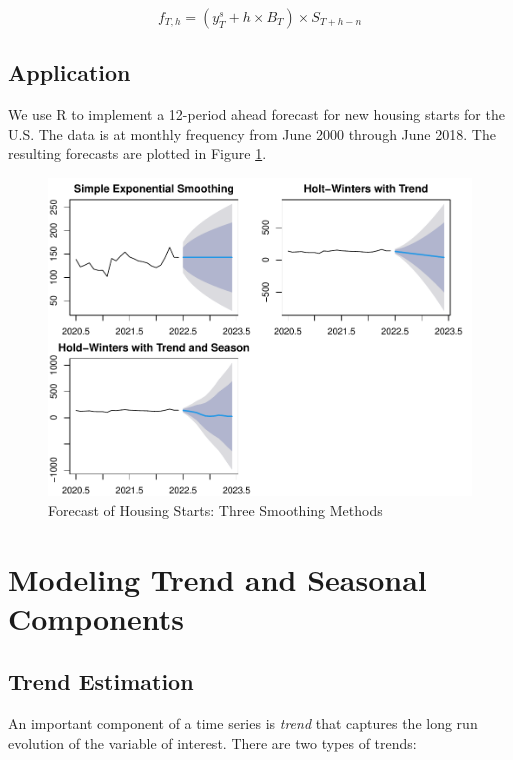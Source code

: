 \documentclass[]{book}
\theoremstyle{definition}
\theoremstyle{definition}
\theoremstyle{definition}
\theoremstyle{remark}
\begin{document}
\begin{equation}
    f_{T,h}= (y_T^s + h\times B_T) \times S_{T+h-n}
   \end{equation}

\hypertarget{application}{%
\section{Application}\label{application}}

We use R to implement a 12-period ahead forecast for new housing starts
for the U.S. The data is at monthly frequency from June 2000 through
June 2018. The resulting forecasts are plotted in Figure
\ref{fig:ch4-figure1}.

\begin{figure}

{\centering \includegraphics[width=0.8\linewidth]{bookdown-demo_files/figure-latex/ch4-figure1-1} 

}

\caption{Forecast of Housing Starts: Three Smoothing Methods}\label{fig:ch4-figure1}
\end{figure}

\hypertarget{modeling-trend-and-seasonal-components}{%
\chapter{Modeling Trend and Seasonal
Components}\label{modeling-trend-and-seasonal-components}}

\hypertarget{trend-estimation}{%
\section{Trend Estimation}\label{trend-estimation}}

An important component of a time series is \emph{trend} that captures
the long run evolution of the variable of interest. There are two types
of trends:
\end{document}
